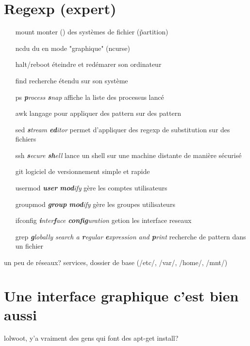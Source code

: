 \documentclass[french, a4paper, 12pt, titlepage]{article}
\begin{document}
\section{Regexp (expert)}
\begin{enumerate}
\item[mount] monter () des systèmes de fichier (\~partition)
\item[ncdu] du en mode "graphique" (ncurse)
\item[halt/reboot] éteindre et redémarer son ordinateur
\item[find] recherche étendu sur son système
\item[ps] \emph{\textbf{p}rocess \textbf{s}nap} affiche la liste des processus lancé
\item[awk] langage pour appliquer des pattern sur des pattern
\item[sed] \emph{\textbf{s}tream \textbf{ed}itor} permet d'appliquer des regexp de substitution sur des fichiers
\item[ssh] \emph{\textbf{s}ecure \textbf{sh}ell} lance un shell sur une machine distante de manière sécurisé
\item[git] logiciel de versionnement simple et rapide
\item[usermod] \emph{\textbf{user} \textbf{mod}ify} gère les comptes utilisateurs
\item[groupmod] \emph{\textbf{group} \textbf{mod}ify} gère les groupes utilisateurs
\item[ifconfig] \emph{\textbf{i}nter\textbf{f}ace \textbf{config}uration} getion les interface reseaux
\item[grep] \emph{\textbf{g}lobally search a \textbf{r}egular \textbf{e}xpression and \textbf{p}rint} recherche de pattern dans un fichier
\end{enumerate}
un peu de réseaux? services,
dossier de base (/etc/, /var/, /home/, /mnt/)

\section{Une interface graphique c'est bien aussi}
lolwoot, y'a vraiment des gens qui font des apt-get install? 
\end{document}
